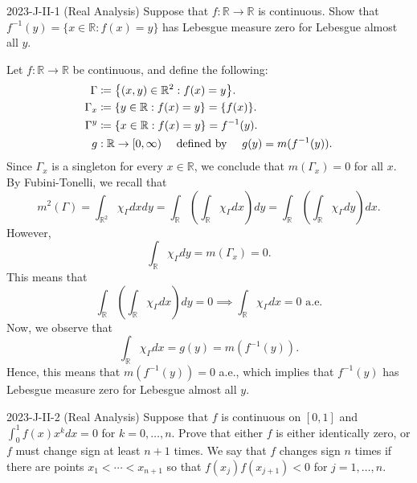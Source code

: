\documentclass{article}
\begin{document}
\begin{prb}{2023-J-II-1 (Real Analysis)}
	Suppose that $f: \mathbb{R} \to \mathbb{R}$ is continuous. Show that $f^{-1}(y) = \{x \in \mathbb{R}: f(x) = y\}$ has Lebesgue measure zero for Lebesgue almost all $y$. 
\end{prb}
\begin{solutions}
	Let $f: \mathbb{R} \to \mathbb{R}$ be continuous, and define the following: 
		\begin{align}
			\begin{split}
				\Gamma &\coloneqq \brac*{(x, y) \in \mathbb{R}^{2}: f(x) = y}. \\
				\Gamma_{x} &\coloneqq \{y \in \mathbb{R}: f(x) = y\} = \{f(x)\}. \\
				\Gamma^{y} &\coloneqq \{x \in \mathbb{R}: f(x) = y\} = f^{-1}(y). \\
				g&: \mathbb{R} \to [0, \infty) \quad \text{ defined by } \quad g(y) = m(f^{-1}(y)).
			\end{split}
		\end{align}
	Since $\Gamma_{x}$ is a singleton for every $x \in \mathbb{R}$, we conclude that $m(\Gamma_{x}) = 0$ for all $x$. By Fubini-Tonelli, we recall that 
		\begin{equation}
			m^{2}(\Gamma) = \int_{\mathbb{R}^{2}}\chi_{\Gamma}dxdy = \int_{\mathbb{R}}\left(\int_{\mathbb{R}}\chi_{\Gamma}dx\right)dy = \int_{\mathbb{R}}\left(\int_{\mathbb{R}}\chi_{\Gamma}dy\right)dx. 
		\end{equation}
	However, 
		\begin{equation}
			\int_{\mathbb{R}}\chi_{\Gamma}dy = m(\Gamma_{x}) = 0. 
		\end{equation}
	This means that 
		\begin{equation}
			\int_{\mathbb{R}}\left(\int_{\mathbb{R}}\chi_{\Gamma}dx\right)dy = 0 \implies \int_{\mathbb{R}}\chi_{\Gamma}dx = 0 \text{ a.e.}
		\end{equation}
	Now, we observe that 
		\begin{equation}
			\int_{\mathbb{R}}\chi_{\Gamma}dx = g(y) = m(f^{-1}(y)).
		\end{equation}
	Hence, this means that $m(f^{-1}(y)) = 0$ a.e., which implies that $f^{-1}(y)$ has Lebesgue measure zero for Lebesgue almost all $y$. 
\end{solutions}
\begin{prb}{2023-J-II-2 (Real Analysis)}
	Suppose that $f$ is continuous on $[0,1]$ and $\int_{0}^{1}f(x)x^{k}dx = 0$ for $k =0, \ldots, n$. Prove that either $f$ is either identically zero, or $f$ must change sign at least $n + 1$ times. We say that $f$ changes sign $n$ times if there are points $x_{1} < \dotsm < x_{n + 1}$ so that $f(x_{j})f(x_{j + 1}) < 0$ for $j = 1, \ldots, n$. 
\end{prb}
\end{document}
